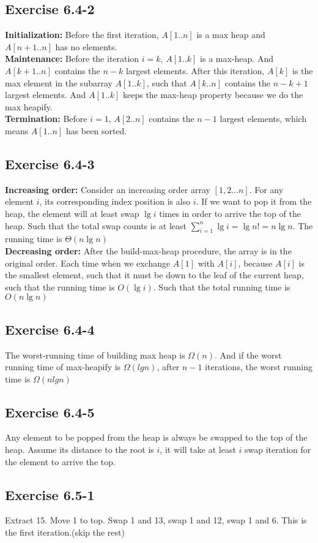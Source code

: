 \documentclass[12pt]{article}
\theoremstyle{definition}
\theoremstyle{remark}
\begin{document}
\subsection*{Exercise 6.4-2}
\textbf{Initialization:} Before the first iteration, $A[1..n]$ is a max heap and $A[n+1..n]$ has no elements.\\
\textbf{Maintenance:} Before the iteration $i=k$, $A[1..k]$ is a max-heap. And $A[k+1..n]$ contains the $n-k$ largest elements. After this iteration, $A[k]$ is the max element in the subarray $A[1..k]$, such that $A[k..n]$ contains the $n-k+1$ largest elements. And $A[1..k]$ keeps the max-heap property because we do the max heapify.\\
\textbf{Termination:} Before $i=1$, $A[2..n]$ contains the $n-1$ largest elements, which means $A[1..n]$ has been sorted.
\subsection*{Exercise 6.4-3}
\textbf{Increasing order:} Consider an increasing order array $[1,2...n]$. For any element $i$, its corresponding index position is also $i$. If we want to pop it from the heap, the element will at least swap $\lg{i}$ times in order to arrive the top of the heap. Such that the total swap counts is at least $\sum_{i=1}^n\lg{i}=\lg{n!}=n\lg{n}$. The running time is $\Theta(n\lg{n})$\\
\textbf{Decreasing order:} After the build-max-heap procedure, the array is in the original order. Each time when we exchange $A[1]$ with $A[i]$, because $A[i]$ is the smallest element, such that it must be down to the leaf of the current heap, such that the running time is $O(\lg{i})$. Such that the total running time is $O(n\lg{n})$
\subsection*{Exercise 6.4-4}
The worst-running time of building max heap is $\Omega(n)$. And if the worst running time of max-heapify is $\Omega(lgn)$, after $n-1$ iterations, the worst running time is $\Omega(nlgn)$
\subsection*{Exercise 6.4-5}
Any element to be popped from the heap is always be swapped to the top of the heap. Assume its distance to the root is $i$, it will take at least $i$ swap iteration for the element to arrive the top. 
\subsection*{Exercise 6.5-1}
Extract 15. Move 1 to top. Swap 1 and 13, swap 1 and 12, swap 1 and 6. This is the first iteration.(skip the rest)
\end{document}

